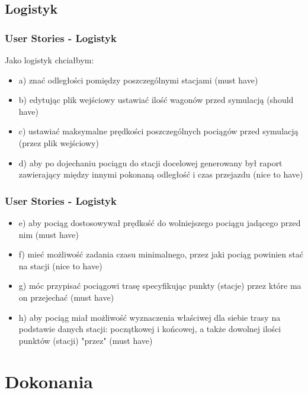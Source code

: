 \documentclass[a4paper, 11pt]{beamer}
\begin{document}
\begin{enumerate}
\subsection{Logistyk}
\begin{frame}
\frametitle{User Stories - Logistyk}
\item Jako logistyk chciałbym:
\begin{itemize}
\color{green}
\item a) znać odległości pomiędzy poszczególnymi stacjami (must have)
\item b) edytując plik wejściowy ustawiać ilość wagonów przed symulacją (should have)
\item c) ustawiać maksymalne prędkości poszczególnych pociągów przed symulacją (przez plik wejściowy)
\item d) aby po dojechaniu pociągu do stacji docelowej generowany był raport zawierający między innymi pokonaną odległość i czas przejazdu (nice to have)
\end{itemize}
\end{frame}
\begin{frame}
\frametitle{User Stories - Logistyk}
\begin{itemize}
\color{green}
\item e) aby pociąg dostosowywał prędkość do wolniejszego pociągu jadącego przed nim (must have)
\item f) mieć możliwość zadania czasu minimalnego, przez jaki pociąg powinien stać na stacji (nice to have)
\item g) móc przypisać pociągowi trasę specyfikując punkty (stacje) przez które ma on przejechać (must have)
\item h) aby pociąg miał możliwość wyznaczenia właściwej dla siebie trasy na podstawie danych stacji: początkowej i końcowej, a także dowolnej ilości punktów (stacji) "przez" (must have)
\end{itemize}
\end{frame}
\end{enumerate}
\section{Dokonania}
\end{document}

